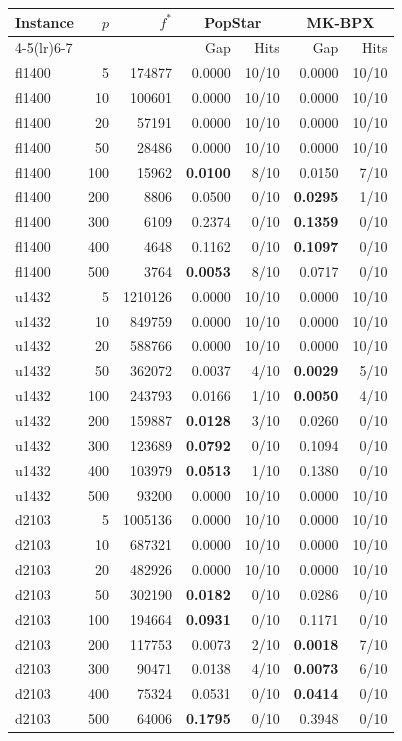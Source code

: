 \begin{tabular}{lrrrrrr}
\toprule
Instance & $p$ & $f^*$ & \multicolumn{2}{c}{PopStar} & \multicolumn{2}{c}{MK-BPX} \\
\cmidrule(lr){4-5}\cmidrule(lr){6-7}
 & & & Gap & Hits & Gap & Hits \\
\midrule
fl1400 & 5 & 174877 & 0.0000 & 10/10 & 0.0000 & 10/10 \\
fl1400 & 10 & 100601 & 0.0000 & 10/10 & 0.0000 & 10/10 \\
fl1400 & 20 & 57191 & 0.0000 & 10/10 & 0.0000 & 10/10 \\
fl1400 & 50 & 28486 & 0.0000 & 10/10 & 0.0000 & 10/10 \\
fl1400 & 100 & 15962 & \textbf{0.0100} & 8/10 & 0.0150 & 7/10 \\
fl1400 & 200 & 8806 & 0.0500 & 0/10 & \textbf{0.0295} & 1/10 \\
fl1400 & 300 & 6109 & 0.2374 & 0/10 & \textbf{0.1359} & 0/10 \\
fl1400 & 400 & 4648 & 0.1162 & 0/10 & \textbf{0.1097} & 0/10 \\
fl1400 & 500 & 3764 & \textbf{0.0053} & 8/10 & 0.0717 & 0/10 \\
\addlinespace[2pt]
u1432 & 5 & 1210126 & 0.0000 & 10/10 & 0.0000 & 10/10 \\
u1432 & 10 & 849759 & 0.0000 & 10/10 & 0.0000 & 10/10 \\
u1432 & 20 & 588766 & 0.0000 & 10/10 & 0.0000 & 10/10 \\
u1432 & 50 & 362072 & 0.0037 & 4/10 & \textbf{0.0029} & 5/10 \\
u1432 & 100 & 243793 & 0.0166 & 1/10 & \textbf{0.0050} & 4/10 \\
u1432 & 200 & 159887 & \textbf{0.0128} & 3/10 & 0.0260 & 0/10 \\
u1432 & 300 & 123689 & \textbf{0.0792} & 0/10 & 0.1094 & 0/10 \\
u1432 & 400 & 103979 & \textbf{0.0513} & 1/10 & 0.1380 & 0/10 \\
u1432 & 500 & 93200 & 0.0000 & 10/10 & 0.0000 & 10/10 \\
\addlinespace[2pt]
d2103 & 5 & 1005136 & 0.0000 & 10/10 & 0.0000 & 10/10 \\
d2103 & 10 & 687321 & 0.0000 & 10/10 & 0.0000 & 10/10 \\
d2103 & 20 & 482926 & 0.0000 & 10/10 & 0.0000 & 10/10 \\
d2103 & 50 & 302190 & \textbf{0.0182} & 0/10 & 0.0286 & 0/10 \\
d2103 & 100 & 194664 & \textbf{0.0931} & 0/10 & 0.1171 & 0/10 \\
d2103 & 200 & 117753 & 0.0073 & 2/10 & \textbf{0.0018} & 7/10 \\
d2103 & 300 & 90471 & 0.0138 & 4/10 & \textbf{0.0073} & 6/10 \\
d2103 & 400 & 75324 & 0.0531 & 0/10 & \textbf{0.0414} & 0/10 \\
d2103 & 500 & 64006 & \textbf{0.1795} & 0/10 & 0.3948 & 0/10 \\
\bottomrule
\end{tabular}